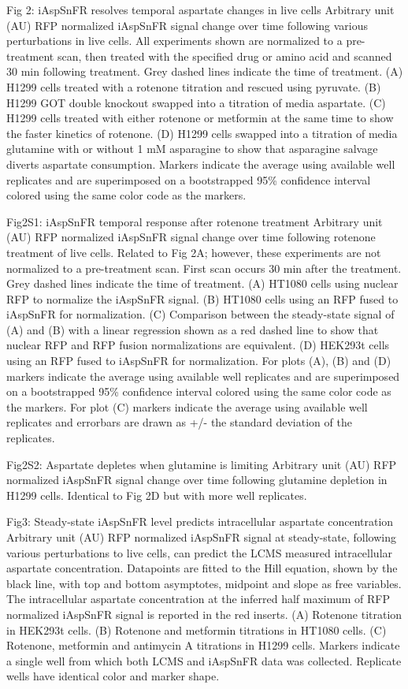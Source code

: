 \documentclass[9pt,lineno]{elife}
\begin{document}
Fig 2:
iAspSnFR resolves temporal aspartate changes in live cells
Arbitrary unit (AU) RFP normalized iAspSnFR signal change over time following various perturbations in live cells. All experiments shown are normalized to a pre-treatment scan, then treated with the specified drug or amino acid and scanned 30 min following treatment. Grey dashed lines indicate the time of treatment. (A) H1299 cells treated with a rotenone titration and rescued using pyruvate. (B) H1299 GOT double knockout swapped into a titration of media aspartate. (C) H1299 cells treated with either rotenone or metformin at the same time to show the faster kinetics of rotenone. (D) H1299 cells swapped into a titration of media glutamine with or without 1 mM asparagine to show that asparagine salvage diverts aspartate consumption. Markers indicate the average using available well replicates and are superimposed on a bootstrapped 95\% confidence interval colored using the same color code as the markers.


Fig2S1:
iAspSnFR temporal response after rotenone treatment
Arbitrary unit (AU) RFP normalized iAspSnFR signal change over time following rotenone treatment of live cells. Related to Fig 2A; however, these experiments are not normalized to a pre-treatment scan. First scan occurs 30 min after the treatment. Grey dashed lines indicate the time of treatment. (A) HT1080 cells using nuclear RFP to normalize the iAspSnFR signal. (B) HT1080 cells using an RFP fused to iAspSnFR for normalization. (C) Comparison between the steady-state signal of (A) and (B) with a linear regression shown as a red dashed line to show that nuclear RFP and RFP fusion normalizations are equivalent. (D) HEK293t cells using an RFP fused to iAspSnFR for normalization. For plots (A), (B) and (D) markers indicate the average using available well replicates and are superimposed on a bootstrapped 95\% confidence interval colored using the same color code as the markers. For plot (C) markers indicate the average using available well replicates and errorbars are drawn as +/- the standard deviation of the replicates.


Fig2S2:
Aspartate depletes when glutamine is limiting
Arbitrary unit (AU) RFP normalized iAspSnFR signal change over time following glutamine depletion in H1299 cells. Identical to Fig 2D but with more well replicates.


Fig3:
Steady-state iAspSnFR level predicts intracellular aspartate concentration
Arbitrary unit (AU) RFP normalized iAspSnFR signal at steady-state, following various perturbations to live cells, can predict the LCMS measured intracellular aspartate concentration. Datapoints are fitted to the Hill equation, shown by the black line, with top and bottom asymptotes, midpoint and slope as free variables. The intracellular aspartate concentration at the inferred half maximum of RFP normalized iAspSnFR signal is reported in the red inserts. (A) Rotenone titration in HEK293t cells. (B) Rotenone and metformin titrations in HT1080 cells. (C) Rotenone, metformin and antimycin A titrations in H1299 cells. Markers indicate a single well from which both LCMS and iAspSnFR data was collected. Replicate wells have identical color and marker shape.
\end{document}
